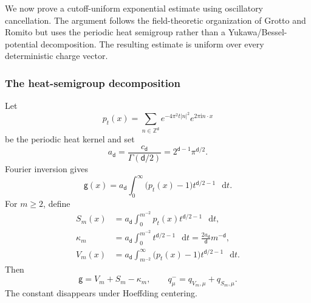 \documentclass[11pt,reqno]{amsart}
\numberwithin{equation}{section}
\theoremstyle{plain}
\theoremstyle{definition}
\renewcommand{\d}{\mathsf d}
\newcommand{\dd}{\mathop{}\!\mathrm d}
\newcommand{\Z}{\mathbb Z}
\newcommand{\g}{\mathsf g}
\begin{document}
We now prove a cutoff-uniform exponential estimate using oscillatory cancellation.  The argument follows the field-theoretic organization of Grotto and Romito \cite{GrottoRomito2020CLT,GrottoRomito2020Correlation} but uses the periodic heat semigroup rather than a Yukawa/Bessel-potential decomposition.  The resulting estimate is uniform over every deterministic charge vector.

\subsubsection{The heat-semigroup decomposition}

Let
\begin{equation}\label{rep:eq:periodic-heat-kernel}
 p_t(x)=\sum_{n\in\Z^{\d}}e^{-4\pi^2t|n|^2}e^{2\pi\mathrm{i} n\cdot x}
\end{equation}
be the periodic heat kernel and set
\begin{equation}\label{rep:eq:ad-heat}
 a_{\d}=\frac{c_{\d}}{\Gamma(\d/2)}=2^{\d-1}\pi^{\d/2}.
\end{equation}
Fourier inversion gives
\begin{equation}\label{rep:eq:heat-representation-g}
 \g(x)=a_{\d}\int_0^\infty\bigl(p_t(x)-1\bigr)t^{\d/2-1}\,\dd t.
\end{equation}
For $m\ge2$, define
\begin{align}
 S_m(x)&=a_{\d}\int_0^{m^{-2}}p_t(x)t^{\d/2-1}\,\dd t,\label{rep:eq:Sm-def}\\
 \kappa_m&=a_{\d}\int_0^{m^{-2}}t^{\d/2-1}\,\dd t
 =\frac{2a_{\d}}{\d}m^{-\d},\label{rep:eq:kappam-def}\\
 V_m(x)&=a_{\d}\int_{m^{-2}}^\infty\bigl(p_t(x)-1\bigr)t^{\d/2-1}\,\dd t.\label{rep:eq:Vm-heat-def}
\end{align}
Then
\begin{equation}\label{rep:eq:heat-split}
 \g=V_m+S_m-\kappa_m,
 \qquad
 q^-_\mu=q_{V_m,\mu}+q_{S_m,\mu}.
\end{equation}
The constant disappears under Hoeffding centering.
\end{document}
